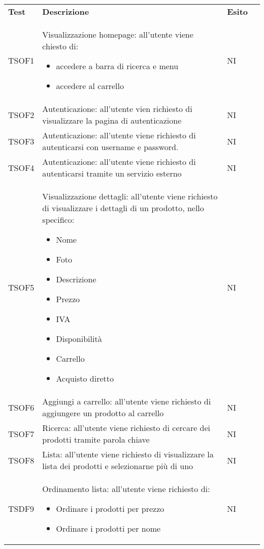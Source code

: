 \begin{center}
    \centering
    \renewcommand{\arraystretch}{1.8}
    \label{tab:TestAccettazione}
    \begin{longtable}[!h]{p{50px} p{245px} p{75px} p{50px}}
        \rowcolor{logo!70} \textbf{Test} & \textbf{Descrizione} & \textbf{Esito} \\
        TSOF1   & Visualizzazione homepage: all'utente viene chiesto di: \begin{itemize} \item accedere a barra di ricerca e menu \item accedere al carrello \end{itemize} & NI \\
        TSOF2   & Autenticazione: all'utente vien richiesto di visualizzare la pagina di autenticazione & NI \\
        TSOF3   & Autenticazione: all'utente viene richiesto di autenticarsi con username e password. & NI \\
        TSOF4   & Autenticazione: all'utente viene richiesto di autenticarsi tramite un servizio esterno & NI \\
        TSOF5   & Visualizzazione dettagli: all'utente viene richiesto di visualizzare i dettagli di un prodotto, nello specifico: \begin{itemize} \item Nome \item Foto \item Descrizione \item Prezzo\item IVA \item Disponibilit\`a \item Carrello \item Acquisto diretto \end{itemize} & NI \\
        TSOF6   & Aggiungi a carrello: all'utente viene richiesto di aggiungere un prodotto al carrello & NI \\
        TSOF7   & Ricerca: all'utente viene richiesto di cercare dei prodotti tramite parola chiave & NI \\
        TSOF8   & Lista: all'utente viene richiesto di visualizzare la lista dei prodotti e selezionarne pi\`u di uno & NI \\
        TSDF9   & Ordinamento lista: all'utente viene richiesto di: \begin{itemize} \item Ordinare i prodotti per prezzo \item Ordinare i prodotti per nome \end{itemize}& NI \\

\end{longtable}
\end{center}
